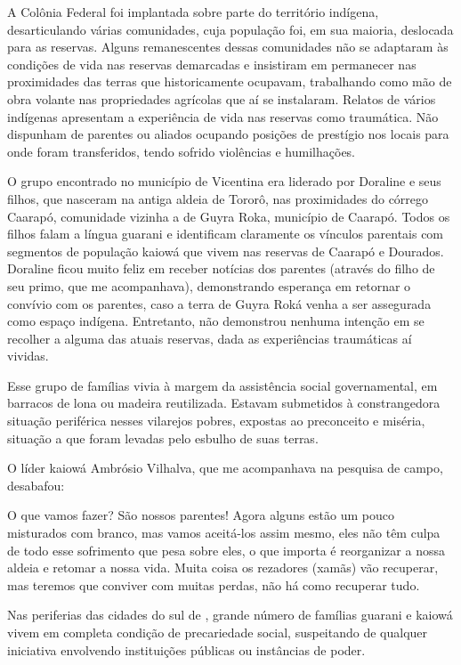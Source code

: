 {{A Colônia Federal foi implantada sobre parte do território indígena,
desarticulando várias comunidades, cuja população foi, em sua maioria,
deslocada para as reservas. Alguns remanescentes dessas comunidades não
se adaptaram às condições de vida nas reservas demarcadas e insistiram
em permanecer nas proximidades das terras que historicamente ocupavam,
trabalhando como mão de obra volante nas propriedades agrícolas que aí
se instalaram. Relatos de vários indígenas apresentam a experiência de
vida nas reservas como traumática. Não dispunham de parentes ou aliados
ocupando posições de prestígio nos locais para onde foram transferidos,
tendo sofrido violências e humilhações.

O grupo encontrado no município de Vicentina era liderado por Doraline e
seus filhos, que nasceram na antiga aldeia de Tororô, nas proximidades
do córrego Caarapó, comunidade vizinha a de Guyra Roka, município de
Caarapó. Todos os filhos falam a língua guarani e identificam
claramente os vínculos parentais com segmentos de população kaiowá que
vivem nas reservas de Caarapó e Dourados. Doraline ficou muito feliz em
receber notícias dos parentes (através do filho de seu primo, que me
acompanhava), demonstrando esperança em retornar o convívio com os
parentes, caso a terra de Guyra Roká venha a ser assegurada como espaço
indígena. Entretanto, não demonstrou nenhuma intenção em se recolher a
alguma das atuais reservas, dada as experiências traumáticas aí
vividas.

Esse grupo de famílias vivia à margem da assistência social
governamental, em barracos de lona ou madeira reutilizada. Estavam
submetidos à constrangedora situação periférica nesses vilarejos
pobres, expostas ao preconceito e miséria, situação a que foram levadas
pelo esbulho de suas terras.

O líder kaiowá Ambrósio Vilhalva, que me acompanhava na pesquisa de
campo, desabafou:

O que vamos fazer? São nossos parentes! Agora alguns estão um pouco
misturados com branco, mas vamos aceitá-los assim mesmo, eles não têm
culpa de todo esse sofrimento que pesa sobre eles, o que importa é
reorganizar a nossa aldeia e retomar a nossa vida. Muita coisa os
rezadores (xamãs) vão recuperar, mas teremos que conviver com muitas
perdas, não há como recuperar tudo.

Nas periferias das cidades do sul de , grande número de famílias
guarani e kaiowá vivem em completa condição de precariedade social,
suspeitando de qualquer iniciativa envolvendo instituições públicas ou
instâncias de poder. 

}}
